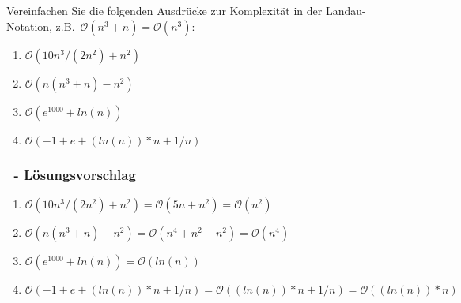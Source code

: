 \subsection{\sBtitle}
\begin{frame}%
  \frametitle{\sBtitle}%
\medskip

Vereinfachen Sie die folgenden Ausdr\"ucke zur Komplexit\"at in der Landau-Notation, z.B.~$\mathcal{O}(n^3+n) = \mathcal{O}(n^3)$:
\begin{enumerate}
  \item $\mathcal{O}(10n^3/(2n^2)+n^2)$
  \item $\mathcal{O}(n(n^3+n)-n^2)$
  \item $\mathcal{O}(e^{1000}+ln (n))$
  \item $\mathcal{O}(-1+e+(ln(n))*n +1/n )$
\end{enumerate}
\end{frame}

\begin{frame}%
  \frametitle{\sBtitle\ - L\"osungsvorschlag}%
\medskip

\begin{enumerate}
  \item $\mathcal{O}(10n^3/(2n^2)+n^2) = \mathcal{O}(5n + n^2) = \mathcal{O}(n^2)$
  \item $\mathcal{O}(n(n^3+n)-n^2) = \mathcal{O}(n^4 + n^2 - n^2) = \mathcal{O}(n^4)$
  \item $\mathcal{O}(e^{1000}+ln (n)) = \mathcal{O}(ln (n))$
  \item $\mathcal{O}(-1+e+(ln(n))*n +1/n) = \mathcal{O}((ln(n)) * n + 1/n) = \mathcal{O}((ln(n)) * n)$
\end{enumerate}
\end{frame}
